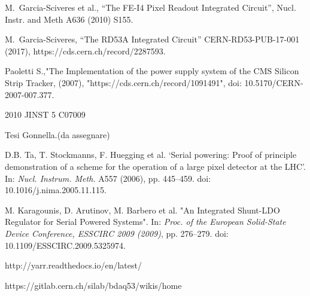 \begin{thebibliography}{1}
 M.~Garcia-Sciveres et al., ``The FE-I4 Pixel Readout
  Integrated Circuit'', Nucl. Instr. and Meth A636 (2010) S155.

 M.~Garcia-Sciveres, ``The RD53A Integrated Circuit''
  CERN-RD53-PUB-17-001 (2017), https://cds.cern.ch/record/2287593.

 Paoletti S.,"The Implementation of the power supply system of the CMS Silicon Strip Tracker, (2007), "https://cds.cern.ch/record/1091491", doi: 10.5170/CERN-2007-007.377.

% 
 2010 JINST 5 C07009


 Tesi Gonnella.(da assegnare)

 D.B. Ta, T. Stockmanns, F. Huegging et al. ‘Serial powering: Proof of principle demonstration of a scheme for the operation of a large pixel detector at the LHC’. In: \textit{Nucl. Instrum. Meth.} A557 (2006), pp. 445–459. doi: 10.1016/j.nima.2005.11.115.

 M. Karagounis, D. Arutinov, M. Barbero et al. "An Integrated Shunt-LDO Regulator
for Serial Powered Systems". In: \textit{Proc. of the European Solid-State Device Conference,
ESSCIRC 2009 (2009)}, pp. 276–279. doi: 10.1109/ESSCIRC.2009.5325974.

 http://yarr.readthedocs.io/en/latest/

 https://gitlab.cern.ch/silab/bdaq53/wikis/home

\end{thebibliography}